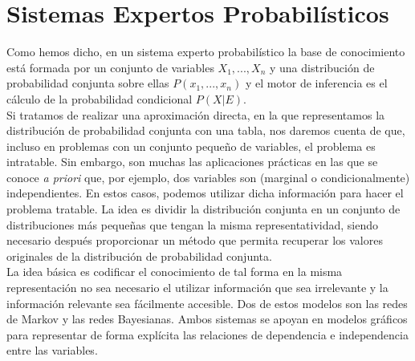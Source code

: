 \documentclass{article}
\theoremstyle{definition_wo_parentheses}
\begin{document}
\section{Sistemas Expertos Probabilísticos}
Como hemos dicho, en un sistema experto probabilístico la base de conocimiento está formada por un conjunto de variables $X_1,...,X_n$ y una distribución de probabilidad conjunta sobre ellas $P(x_1,...,x_n)$ y el motor de inferencia es el cálculo de la probabilidad condicional $P(X|E)$.\\
Si tratamos de realizar una aproximación directa, en la que representamos la distribución de probabilidad conjunta con una tabla, nos daremos cuenta de que, incluso en problemas con un conjunto pequeño de variables, el problema es intratable. Sin embargo, son muchas las aplicaciones prácticas en las que se conoce \textit{a priori} que, por ejemplo, dos variables son (marginal o condicionalmente) independientes. En estos casos, podemos utilizar dicha información para hacer el problema tratable. La idea es dividir la distribución conjunta en un conjunto de distribuciones más pequeñas que tengan la misma representatividad, siendo necesario después proporcionar un método que permita recuperar los valores originales de la distribución de probabilidad conjunta.\\
La idea básica es codificar el conocimiento de tal forma en la misma representación no sea necesario el utilizar información que sea irrelevante y la información relevante sea fácilmente accesible. Dos de estos modelos son las redes de Markov y las redes Bayesianas. Ambos sistemas se apoyan en modelos gráficos para representar de forma explícita las relaciones de dependencia e independencia entre las variables.
\end{document}
